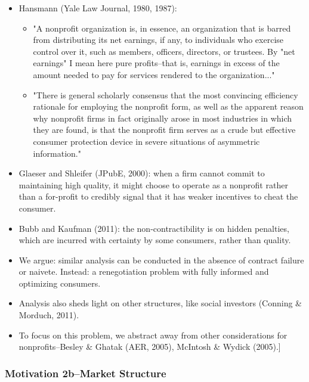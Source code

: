 \documentclass[11pt]{article}%
\begin{document}
\begin{itemize}
\item Hansmann (Yale Law Journal, 1980, 1987):

\begin{itemize}
\item "A nonprofit organization is, in essence, an organization that is barred
from distributing its net earnings, if any, to individuals who exercise
control over it, such as members, officers, directors, or trustees. By "net
earnings" I mean here pure profits--that is, earnings in excess of the amount
needed to pay for services rendered to the organization..."

\item "There is general scholarly consensus that the most convincing
efficiency rationale for employing the nonprofit form, as well as the apparent
reason why nonprofit firms in fact originally arose in most industries in
which they are found, is that the nonprofit firm serves as a crude but
effective consumer protection device in severe situations of asymmetric information."
\end{itemize}

\item Glaeser and Shleifer (JPubE, 2000): when a firm cannot commit to
maintaining high quality, it might choose to operate as a nonprofit rather
than a for-profit to credibly signal that it has weaker incentives to cheat
the consumer.

\item Bubb and Kaufman (2011): the non-contractibility is on hidden penalties,
which are incurred with certainty by some consumers, rather than quality.

\item We argue: similar analysis can be conducted in the absence of contract
failure or naivete. Instead: a renegotiation problem with fully informed and
optimizing consumers.

\item Analysis also sheds light on other structures, like social investors
(Conning \& Morduch, 2011).

\item \lbrack To focus on this problem, we abstract away from other
considerations for nonprofits--Besley \& Ghatak (AER, 2005), McIntosh \&
Wydick (2005).]
\end{itemize}

\frametitle{Motivation 2b--Market Structure}
\end{document}
